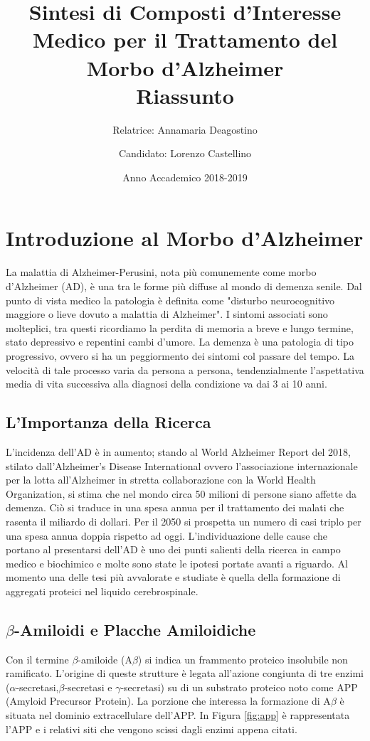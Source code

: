 \documentclass[a4paper, 11pt]{article}
\title{{\large Sintesi di Composti d'Interesse Medico per il Trattamento del Morbo d'Alzheimer} \\ {\large Riassunto}}
\author{{\small
			Relatrice: Annamaria Deagostino}
	\and
	{\small Candidato: Lorenzo Castellino
	}}
\date{{\small Anno Accademico 2018-2019}}
\begin{document}
\maketitle


\section{Introduzione al Morbo d'Alzheimer}
La malattia di Alzheimer-Perusini, nota più comunemente come morbo d'Alzheimer (AD), è una tra le forme più diffuse al mondo di demenza senile. Dal punto di vista medico la patologia è definita come "disturbo neurocognitivo maggiore o lieve dovuto a malattia di Alzheimer". I sintomi associati sono molteplici, tra questi ricordiamo la perdita di memoria a breve e lungo termine, stato depressivo e repentini cambi d'umore. La demenza è una patologia di tipo progressivo, ovvero si ha un peggiormento dei sintomi col passare del tempo. La velocità di tale processo varia da persona a persona, tendenzialmente l'aspettativa media di vita successiva alla diagnosi della condizione va dai 3 ai 10 anni. \cite{todd_survival_2013}

\subsection{L'Importanza della Ricerca}
L'incidenza dell'AD è in aumento; stando al World Alzheimer Report del 2018, stilato dall'Alzheimer's Disease International ovvero l'associazione internazionale per la lotta all'Alzheimer in stretta collaborazione con la World Health Organization, si stima che nel mondo circa 50 milioni di persone siano affette da demenza. Ciò si traduce in una spesa annua per il trattamento dei malati che rasenta il miliardo di dollari. Per il 2050 si prospetta un numero di casi triplo per una spesa annua doppia rispetto ad oggi. \cite{noauthor_world_2018}
L'individuazione delle cause che portano al presentarsi dell'AD è uno dei punti salienti della ricerca in campo medico e biochimico e molte sono state le ipotesi portate avanti a riguardo. Al momento una delle tesi più avvalorate e studiate è quella della formazione di aggregati proteici nel liquido cerebrospinale.

\subsection{$\beta$-Amiloidi e Placche Amiloidiche}
Con il termine $\beta$-amiloide (A$\beta$) si indica un frammento proteico insolubile non ramificato.
L'origine di queste strutture è legata all'azione congiunta di tre enzimi ($\alpha$-secretasi,$\beta$-secretasi e $\gamma$-secretasi) su di un substrato proteico noto come APP (Amyloid Precursor Protein). La porzione che interessa la formazione di A$\beta$ è situata nel dominio extracellulare dell'APP. In Figura \ref{fig:app} è rappresentata l'APP e i relativi siti che vengono scissi dagli enzimi appena citati. \cite{goedert_century_2006}
\end{document}

